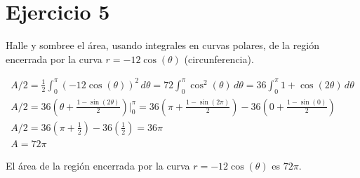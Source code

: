 \section*{Ejercicio 5}
\noindent Halle y sombree el área, usando integrales en curvas polares, de la región encerrada por la curva \(r = -12\cos(\theta)\) (circunferencia).

\begin{gather*}
  A / 2 = \frac{1}{2} \int_{0}^{\pi} (-12\cos(\theta))^2 \, d\theta %
    = 72 \int_{0}^{\pi} \cos^2(\theta) \, d\theta %
    = 36 \int_{0}^{\pi} 1 + \cos(2\theta) \, d\theta \\
  A / 2 = 36 \left(\theta + \frac{1 - \sin(2\theta)}{2}\right) \bigg|_{0}^{\pi} %
    = 36 \left(\pi + \frac{1 - \sin(2\pi)}{2}\right) - 36 \left(0 + \frac{1 - \sin(0)}{2}\right) \\
  A / 2 = 36 \left(\pi + \frac{1}{2}\right) - 36 \left(\frac{1}{2}\right) %
    = 36\pi \\
  A = 72\pi
\end{gather*}

\noindent El área de la región encerrada por la curva \(r = -12\cos(\theta)\) es \(72\pi\).

\vspace{4cm}